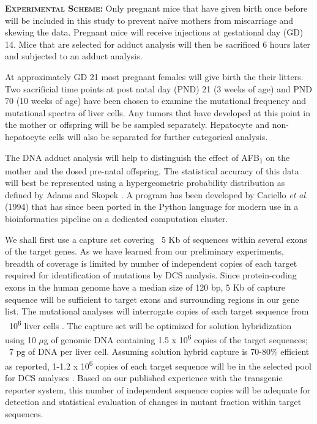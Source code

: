 \documentclass[12pt]{article}
\let\cite\shortcite %
\begin{document}
\vspace{4mm}\noindent\textbf{\textsc{Experimental Scheme: }}
Only pregnant mice that have given birth once before will be included in this study to prevent na{\"i}ve mothers from miscarriage and skewing the data.
Pregnant mice will receive injections at gestational day (GD) 14. Mice that are selected for adduct analysis will then be sacrificed 6 hours later and subjected to an adduct analysis.

At approximately GD 21 most pregnant females will give birth the their litters.
Two sacrificial time points at post natal day (PND) 21 (3 weeks of age) and PND 70 (10 weeks of age) have been chosen to examine the mutational frequency and mutational spectra of liver cells.
Any tumors that have developed at this point in the mother or offspring will be be sampled separately.
Hepatocyte and non-hepatocyte cells will also be separated for further categorical analysis.

The DNA adduct analysis will help to distinguish the effect of AFB\textsubscript{1} on the mother and the dosed pre-natal offspring.
The statistical accuracy of this data will best be represented using a hypergeometric probability distribution as defined by Adams and Skopek \cite{Adams1987}.
A program has been developed by Cariello \emph{et al.} (1994) that has since been ported in the Python language for modern use in a bioinformatics pipeline on a dedicated computation cluster.

\vspace{4mm}
We shall first use a capture set covering ~5 Kb of sequences within several exons of the target genes.
As we have learned from our preliminary experiments, breadth of coverage is limited by number of independent copies of each target required for identification of mutations by DCS analysis.
Since protein-coding exons in the human genome have a median size of 120 bp, 5 Kb of capture sequence will be sufficient to target exons and surrounding regions in our gene list.
The mutational analyses will interrogate copies of each target sequence from ~10\textsuperscript{6} liver cells \cite{Chawanthayatham2014a}.
The capture set will be optimized for solution hybridization using 10 $\mu$g of genomic DNA containing 1.5 x 10\textsuperscript{6} copies of the target sequences; ~7 pg of DNA per liver cell.
Assuming solution hybrid capture is 70-80\% efficient as reported, 1-1.2 x 10\textsuperscript{6} copies of each target sequence will be in the selected pool for DCS analyses \cite{Parla2011}.
Based on our published experience with the transgenic reporter system, this number of independent sequence copies will be adequate for detection and statistical evaluation of changes in mutant fraction within target sequences.
\end{document}
